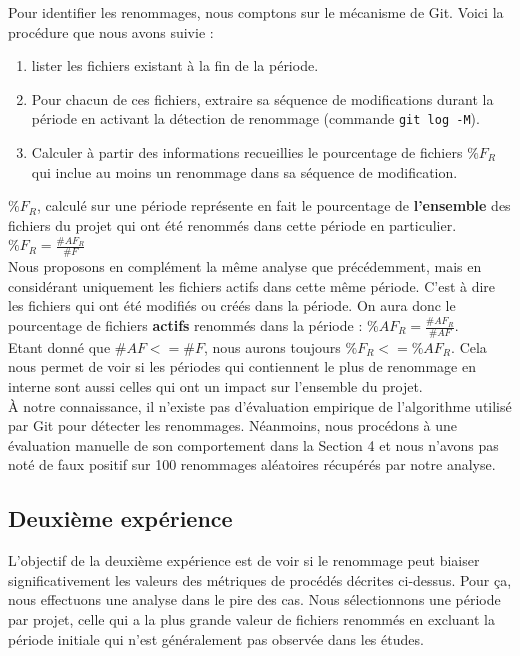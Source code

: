 Pour identifier les renommages, nous comptons sur le mécanisme de Git. Voici la procédure que nous avons suivie :
\begin{enumerate}
\item lister les fichiers existant à la fin de la période.
\item Pour chacun de ces fichiers, extraire sa séquence de modifications durant la période en activant la détection de renommage (commande \texttt{git log -M}).
\item Calculer à partir des informations recueillies le pourcentage de fichiers $\%F_{R}$ qui inclue au moins un renommage dans sa séquence de modification.
\end{enumerate}
\medskip

$\%F_{R}$, calculé sur une période représente en fait le pourcentage de \textbf{l'ensemble} des fichiers du projet qui ont été renommés dans cette période en particulier. $\%F_{R} = \frac{\#AF_{R}}{\#F}$ \\

Nous proposons en complément la même analyse que précédemment, mais en considérant uniquement les fichiers actifs dans cette même période. C'est à dire les fichiers qui ont été modifiés ou créés dans la période. On aura donc le pourcentage de fichiers \textbf{actifs} renommés dans la période : 
$\%AF_{R} = \frac{\#AF_{R}}{\#AF}$. \\
Etant donné que ${\#AF} <= {\#F}$, nous aurons toujours $\%F_{R} <= \%AF_{R}$. Cela nous permet de voir si les périodes qui contiennent le plus de renommage en interne sont aussi celles qui ont un impact sur l'ensemble du projet.\\

À notre connaissance, il n'existe pas d'évaluation empirique de l'algorithme utilisé par Git pour détecter les renommages. Néanmoins, nous procédons à une évaluation manuelle de son comportement dans la Section 4 et nous n'avons pas noté de faux positif sur 100 renommages aléatoires récupérés par notre analyse.\\

\subsection{Deuxième expérience}

L'objectif de la deuxième expérience est de voir si le renommage peut biaiser significativement les valeurs des métriques de procédés décrites ci-dessus. Pour ça, nous effectuons une analyse dans le pire des cas. Nous sélectionnons une période par projet, celle qui a la plus grande valeur de fichiers renommés en excluant la période initiale qui n'est généralement pas observée dans les études.\\ 

